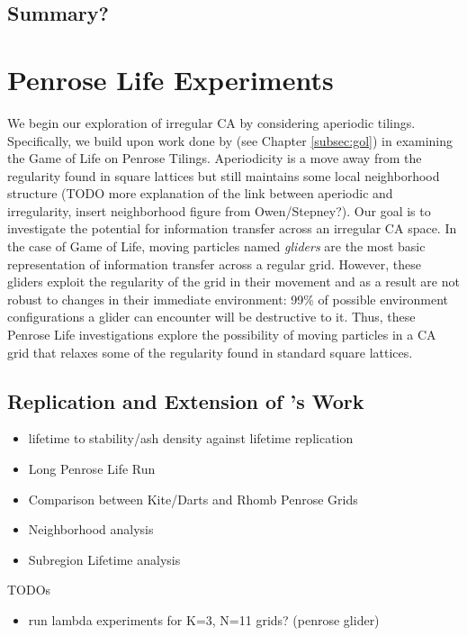 \documentclass[a4paper,11pt]{report}
\begin{document}
\section{Summary?}

\processdelayedfloats

\chapter{Penrose Life Experiments}
\label{ch:penrose}

We begin our exploration of irregular CA by considering aperiodic tilings. Specifically, we build upon work done by \citeauthor{hi05} (see Chapter \ref{subsec:gol}) in examining the Game of Life on Penrose Tilings. Aperiodicity is a move away from the regularity found in square lattices but still maintains some local neighborhood structure (TODO more explanation of the link between aperiodic and irregularity, insert neighborhood figure from Owen/Stepney?). Our goal is to investigate the potential for information transfer across an irregular CA space. In the case of Game of Life, moving particles named \textit{gliders} are the most basic representation of information transfer across a regular grid. However, these gliders exploit the regularity of the grid in their movement and as a result are not robust to changes in their immediate environment: 99\% of possible environment configurations a glider can encounter will be destructive to it. Thus, these Penrose Life investigations explore the possibility of moving particles in a CA grid that relaxes some of the regularity found in standard square lattices.     

\section{Replication and Extension of \citeauthor{hi05}'s Work}

\begin{itemize}
\item lifetime to stability/ash density against lifetime replication
\item Long Penrose Life Run
\item Comparison between Kite/Darts and Rhomb Penrose Grids
\item Neighborhood analysis
\item Subregion Lifetime analysis
\end{itemize}

TODOs
\begin{itemize}
\item run lambda experiments for K=3, N=11 grids? (penrose glider)
\end{itemize}
\end{document}
